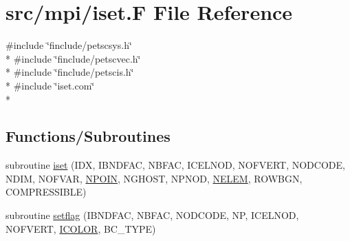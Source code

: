 \hypertarget{mpi_2iset_8_f}{\section{src/mpi/iset.F File Reference}
\label{mpi_2iset_8_f}
}
{\ttfamily \#include \char`\"{}finclude/petscsys.\-h\char`\"{}}\\*
{\ttfamily \#include \char`\"{}finclude/petscvec.\-h\char`\"{}}\\*
{\ttfamily \#include \char`\"{}finclude/petscis.\-h\char`\"{}}\\*
{\ttfamily \#include \char`\"{}iset.\-com\char`\"{}}\\*
\subsection*{Functions/\-Subroutines}
\begin{DoxyCompactItemize}
\item 
subroutine \hyperlink{mpi_2iset_8_f_af38962e0be9fc6bcabd0b07f202567e7}{iset} (I\-D\-X, I\-B\-N\-D\-F\-A\-C, N\-B\-F\-A\-C, I\-C\-E\-L\-N\-O\-D, N\-O\-F\-V\-E\-R\-T, N\-O\-D\-C\-O\-D\-E, N\-D\-I\-M, N\-O\-F\-V\-A\-R, \hyperlink{mesh_8com_ae28c1572321efcd8715b974d87d20c58}{N\-P\-O\-I\-N}, N\-G\-H\-O\-S\-T, N\-P\-N\-O\-D, \hyperlink{mesh_8com_aee5e75b79d0e815c0603cfbccc618957}{N\-E\-L\-E\-M}, R\-O\-W\-B\-G\-N, C\-O\-M\-P\-R\-E\-S\-S\-I\-B\-L\-E)
\item 
subroutine \hyperlink{mpi_2iset_8_f_a66ee82f2074a3f320de34d4fb54d0c5f}{setflag} (I\-B\-N\-D\-F\-A\-C, N\-B\-F\-A\-C, N\-O\-D\-C\-O\-D\-E, N\-P, I\-C\-E\-L\-N\-O\-D, N\-O\-F\-V\-E\-R\-T, \hyperlink{bnd_8com_a80aa0313e1ef320813f587804c852992}{I\-C\-O\-L\-O\-R}, B\-C\-\_\-\-T\-Y\-P\-E)
\end{DoxyCompactItemize}


